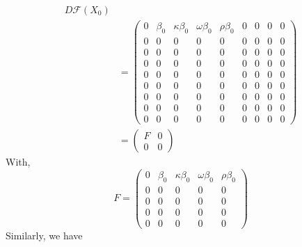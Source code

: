\documentclass[fleqn,10pt]{wlscirep}
\begin{document}
\begin{equation}
\begin{split}
D \mathcal{F}(X_0) \\
&=  \begin{pmatrix}
0 & \beta_0 & \kappa \beta_0 & \omega \beta_0 & \rho \beta_0 & 0 & 0 & 0 & 0 \\
0 & 0 & 0 & 0 & 0 & 0 &0 & 0 &0 \\
0 & 0 & 0 & 0 & 0 & 0 &0 & 0 &0 \\
0 & 0 & 0 & 0 & 0 & 0 &0 & 0 &0 \\
0 & 0 & 0 & 0 & 0 & 0 &0 & 0 &0 \\
0 & 0 & 0 & 0 & 0 & 0 &0 & 0 &0 \\
0 & 0 & 0 & 0 & 0 & 0 &0 & 0 &0 \\
0 & 0 & 0 & 0 & 0 & 0 &0 & 0 &0 \\
0 & 0 & 0 & 0 & 0 & 0 &0 & 0 &0
 \end{pmatrix}\\
 &=  \begin{pmatrix}
 F & 0\\
 0 & 0
  \end{pmatrix}
\end{split}
\label{eqn:DFE-1}
\end{equation}
%
%
With,
%
%
\begin{equation}
F = \begin{pmatrix}
0 & \beta_0 & \kappa \beta_0 & \omega \beta_0 & \rho \beta_0 \\
0 & 0 & 0 & 0 & 0\\
0 & 0 & 0 & 0 & 0\\
0 & 0 & 0 & 0 & 0\\
0 & 0 & 0 & 0 & 0
  \end{pmatrix}
  \label{eqn:DFE-2}
\end{equation}
%
%
Similarly, we have 
%
%
\end{document}
